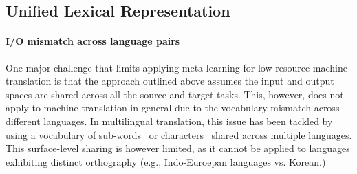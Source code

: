 


\subsection{Unified Lexical Representation}%
\label{cp6.sec.ulr}


\paragraph{I/O mismatch across language pairs}
One major challenge that limits applying meta-learning for low resource machine translation is that
the approach outlined above assumes the input and output spaces are shared across all the source and target tasks. This, however, does not apply to machine translation in general due to the vocabulary mismatch across different languages. In multilingual translation, this issue has been tackled by using a vocabulary of sub-words~\citep{sennrich2015improving} or characters~\citep{lee2016fully} shared across multiple languages. This surface-level sharing is however limited, as it cannot be applied to languages exhibiting distinct orthography (e.g., Indo-Euroepan languages vs. Korean.) 


